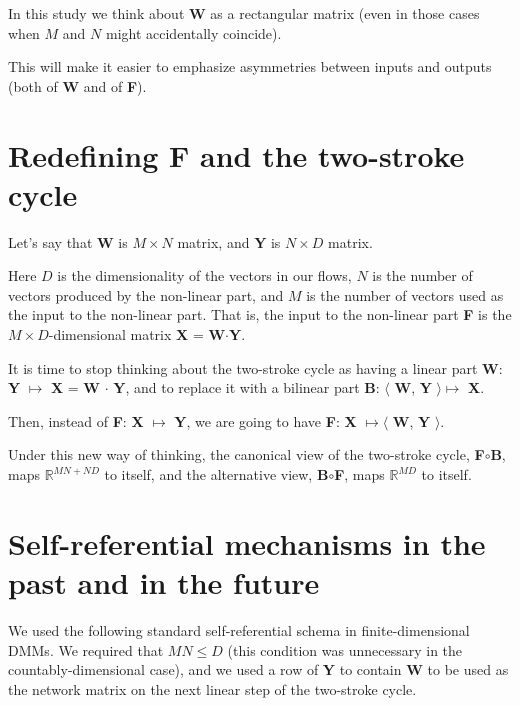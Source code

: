 \documentclass{article}
\begin{document}
\bigskip

In this study we think about {\bf W} as a rectangular matrix (even in those cases when $M$ and $N$ might accidentally coincide).

\smallskip

This will make it easier to emphasize asymmetries between inputs and outputs (both of {\bf W} and of {\bf F}).

\section{Redefining {\bf F} and the two-stroke cycle}

Let's say that {\bf W} is $M\!\!\times\!\!N$ matrix, and {\bf Y} is $N\!\!\times\!\!D$ matrix. 

\smallskip

Here $D$ is the dimensionality of the vectors in our flows, $N$ is the number of vectors produced by the non-linear part, and $M$ is the number of vectors used as the input to the non-linear part. That is, the input to the non-linear part {\bf F} is the 
$M\!\!\times\!\!D$-dimensional matrix {\bf X} = {\bf W}$\cdot${\bf Y}.

\bigskip

It is time to stop thinking about the two-stroke cycle as having a linear part {\bf W}: {\bf Y} $\mapsto$ {\bf X} = {\bf W} $\cdot$ {\bf Y}, and to replace it with a bilinear part {\bf B}: $\langle\!\!$ {\bf W}, {\bf Y} $\!\!\rangle \mapsto$ {\bf X}.

\smallskip

Then, instead of {\bf F}: {\bf X} $\mapsto$ {\bf Y}, we are going to have {\bf F}: {\bf X} $\mapsto \langle\!\!$ {\bf W}, {\bf Y} $\!\!\rangle$.

\smallskip

Under this new way of thinking, the canonical view of the two-stroke cycle, {\bf F}$\circ${\bf B}, maps $\mathbb{R}^{MN+ND}$ to itself, and the alternative view, {\bf B}$\circ${\bf F}, maps $\mathbb{R}^{MD}$ to itself.

\section{Self-referential mechanisms in the past and in the future}

We used the following standard self-referential schema in finite-dimensional DMMs. We required that $MN \!\leq\! D$ (this
condition was unnecessary in the countably-dimensional case), and we used a row of {\bf Y} to contain {\bf W} to be used as
the network matrix on the next linear step of the two-stroke cycle.
\end{document}

